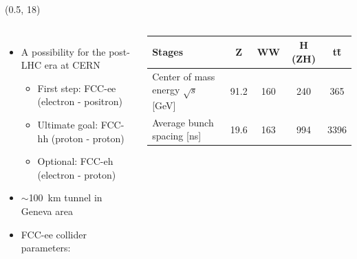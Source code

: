 \documentclass[final,xcolor={dvipsnames,svgnames,x11names,table}]{beamer}
\begin{document}
\begin{frame}
\begin{textblock}{44.5}(0.5, 18)
  \begin{tcolorbox}[title=The Future Circular Collider Experiment (FCC)]

  \begin{columns}
      \begin{itemize}
        \item A possibility for the post-LHC era at CERN \vspace{0.5cm}

          \begin{itemize}
            \item First step: FCC-ee (electron - positron)
            \item Ultimate goal: FCC-hh (proton - proton)
            \item Optional: FCC-eh (electron - proton) \vspace{0.5cm}
          \end{itemize}
        \item $\sim$100~km tunnel in Geneva area \vspace{0.2cm}
        \item FCC-ee collider parameters: \vspace{0.2cm}
      \end{itemize}
        \centering
      	\begin{tabular}{| l | c | c | c | c |}
        	\toprule
      	   Stages & Z & WW & H (ZH) & t\={t} \\
      	   \midrule
           Center of mass energy $\sqrt{s}$ [GeV] & 91.2 & 160 & 240 & 365 \\
           Average bunch spacing [ns] & 19.6 & 163 & 994 & 3396\\
      	   \bottomrule
      	\end{tabular}

    \vspace{0.5cm}


\end{columns}
\end{tcolorbox}
\end{textblock}
\end{frame}
\end{document}

